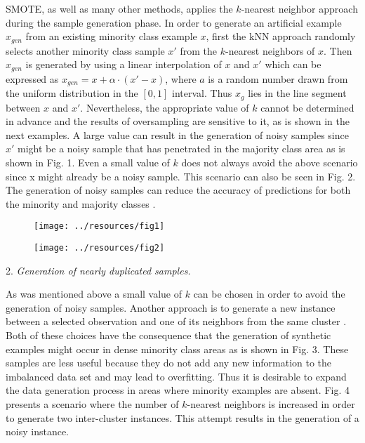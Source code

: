 \documentclass[parskip=full]{scrartcl}
\begin{document}
SMOTE, as well as many other methods, applies the \(k\)-nearest neighbor approach during the sample generation phase. In order to generate an artificial example \(x_{gen}\) from an existing minority class example \(x\), first the kNN approach randomly selects another minority class sample \(x'\) from the \(k\)-nearest neighbors of \(x\). Then \(x_{gen}\) is generated by using a linear interpolation of \(x\) and \(x'\) which can be expressed as \( x_{gen} = x + \alpha \cdot (x' - x) \), where \(a\) is a random number drawn from the uniform distribution in the \([0, 1]\) interval. Thus \( x_{g} \) lies in the line segment between \(x\) and \(x'\). Nevertheless, the appropriate value of \(k\) cannot be determined in advance and the results of oversampling are sensitive to it, as is shown in the next examples. A large value can result in the generation of noisy samples since \(x'\) might be a noisy sample that has penetrated in the majority class area as is shown in Fig. 1.  Even a small value of \(k\) does not always avoid the above scenario since x might already be a noisy sample. This scenario can also be seen in Fig. 2. The generation of noisy samples can reduce the accuracy of predictions for both the minority and majority classes \cite{Kotsiantis2006}.

\begin{figure}[H]
	\centering
	\texttt{[image: ../resources/fig1]}
\end{figure}


\begin{figure}[H]
	\centering
	\texttt{[image: ../resources/fig2]}
\end{figure}

2. \textit{Generation of nearly duplicated samples.}

As was mentioned above a small value of \(k\) can be chosen in order to avoid the generation of noisy samples. Another approach is to generate a new instance between a selected observation and one of its neighbors from the same cluster \cite{Barua2014}. Both of these choices have the consequence that the generation of synthetic examples might occur in dense minority class areas as is shown in Fig. 3. These samples are less useful because they do not add any new information to the imbalanced data set and may lead to overfitting. Thus it is desirable to expand the data generation process in areas where minority examples are absent. Fig. 4 presents a scenario where the number of \(k\)-nearest neighbors is increased in order to generate two inter-cluster instances. This attempt results in the generation of a noisy instance.
\end{document}
